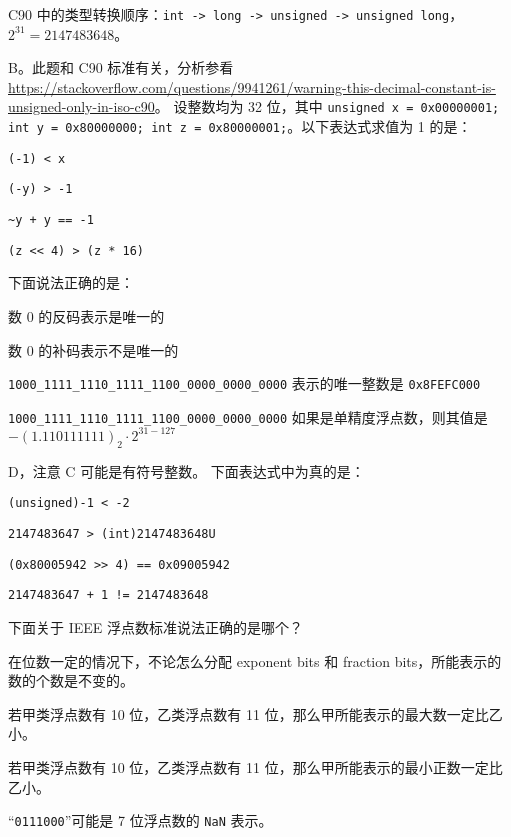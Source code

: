 \begin{problems}
		\begin{hint}
			C90 中的类型转换顺序：\texttt{int -> long -> unsigned -> unsigned long}，$2^{31}=2147483648$。
		\end{hint}
		\sol B。此题和 C90 标准有关，分析参看 \url{https://stackoverflow.com/questions/9941261/warning-this-decimal-constant-is-unsigned-only-in-iso-c90}。
		 设整数均为 32 位，其中 \texttt{unsigned x = 0x00000001; int y = 0x80000000; int z = 0x80000001;}。以下表达式求值为 1 的是：
		\begin{choices}
			\item \verb|(-1) < x|
			\item \verb|(-y) > -1|
			\item \verb|~y + y == -1|
			\item \verb|(z << 4) > (z * 16)|
		\end{choices}
		 下面说法正确的是：
		\begin{choices}
			\item 数 0 的反码表示是唯一的
			\item 数 0 的补码表示不是唯一的
			\item \verb|1000_1111_1110_1111_1100_0000_0000_0000| 表示的唯一整数是 \texttt{0x8FEFC000}
			\item \verb|1000_1111_1110_1111_1100_0000_0000_0000| 如果是单精度浮点数，则其值是 $-(1.110111111)_2 \cdot 2^{31-127}$
		\end{choices}
		\sol D，注意 C 可能是有符号整数。
		 下面表达式中为真的是：
		\begin{choices}
			\item \verb|(unsigned)-1 < -2|
			\item \verb|2147483647 > (int)2147483648U|
			\item \verb|(0x80005942 >> 4) == 0x09005942|
			\item \verb|2147483647 + 1 != 2147483648|
		\end{choices}
         下面关于 IEEE 浮点数标准说法正确的是哪个？
		\begin{choices}
			\item 在位数一定的情况下，不论怎么分配 exponent bits 和 fraction bits，所能表示的数的个数是不变的。
			\item 若甲类浮点数有 10 位，乙类浮点数有 11 位，那么甲所能表示的最大数一定比乙小。
			\item 若甲类浮点数有 10 位，乙类浮点数有 11 位，那么甲所能表示的最小正数一定比乙小。
		    \item “\texttt{0111000}”可能是 7 位浮点数的 \texttt{NaN} 表示。

\end{choices}
\end{problems}
